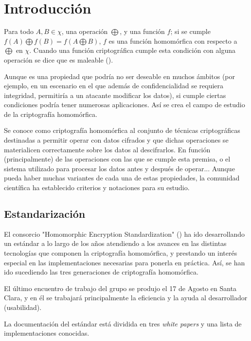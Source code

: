 \chapter{Introducción}
\label{chap:intro}

Para todo $ A,B \in \chi{} $, una operación $ \bigoplus $, y una función $f$; si se cumple $ f(A) \bigoplus f(B) = f(A \bigoplus B)$, $ f $ es una función homomórfica con respecto a $ \bigoplus $ en $ \chi{} $. Cuando una función criptográfica cumple esta condición con alguna operación se dice que es maleable (\cite{dolev_non-malleable_1991}).

Aunque es una propiedad que podría no ser deseable en muchos ámbitos (por ejemplo, en un escenario en el que además de confidencialidad se requiera integridad, permitiría a un atacante modificar los datos), si cumple ciertas condiciones podría tener numerosas aplicaciones. Así se crea el campo de estudio de la criptografía homomórfica.

Se conoce como criptografía homomórfica al conjunto de técnicas criptográficas destinadas a permitir operar con datos cifrados y que dichas operaciones se materialicen correctamente sobre los datos al descifrarlos. En función (principalmente) de las operaciones con las que se cumple esta premisa, o el sistema utilizado para procesar los datos antes y después de operar... Aunque pueda haber muchas variantes de cada una de estas propiedades, la comunidad científica ha establecido criterios y notaciones para su estudio.

\section{Estandarización}

El consorcio "Homomorphic Encryption Standardization" (\cite{albrecht_homomorphic_2018}) ha ido desarrollando un estándar a lo largo de los años atendiendo a los avances en las distintas tecnologías que componen la criptografía homomórfica, y prestando un interés especial en las implementaciones necesarias para ponerla en práctica. Así, se han ido sucediendo las tres generaciones de criptografía homomórfica.

El último encuentro de trabajo del grupo se produjo el 17 de Agosto en Santa Clara, y en él se trabajará principalmente la eficiencia y la ayuda al desarrollador (usabilidad).

La documentación del estándar está dividida en tres \textit{white papers} y una lista de implementaciones conocidas.


